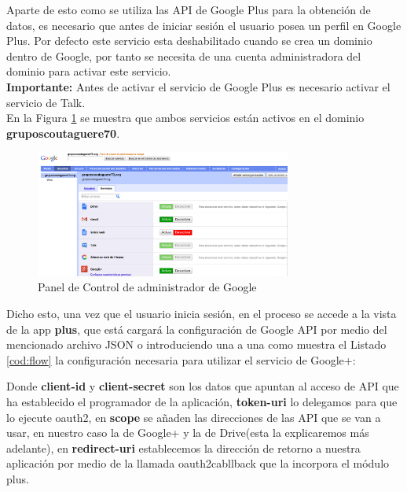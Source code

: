 Aparte de esto como se utiliza las API de Google Plus para la obtención de datos, es necesario que antes de iniciar sesión el usuario posea un perfil en Google Plus.
Por defecto este servicio esta deshabilitado cuando se crea un dominio dentro de Google, por tanto se necesita de una cuenta administradora del dominio para activar este servicio.\\

\textbf{Importante:} Antes de activar el servicio de Google Plus es necesario activar el servicio de Talk.\\

En la Figura \ref{fig:panel} se muestra  que ambos servicios están activos en el dominio \textbf{gruposcoutaguere70}.\\

\begin{figure}[H]
\begin{center}
\includegraphics[width=0.75\textwidth]{images/panel_google.jpg}
\caption{Panel de Control de administrador de Google}
\label{fig:panel}
\end{center}
\end{figure}


Dicho esto, una vez que el usuario inicia sesión, en el proceso se accede a la vista de la app \textbf{plus}, que está cargará la configuración de Google API por medio del mencionado archivo JSON o introduciendo una a una 
como muestra el Listado \ref{cod:flow} la configuración necesaria para utilizar el servicio de Google+:\\



\bigskip

Donde \textbf{client-id} y \textbf{client-secret} son los datos que apuntan al acceso de API que ha establecido el programador de la aplicación, \textbf{token-uri} lo delegamos para que lo ejecute oauth2, en \textbf{scope}
se añaden las direcciones de las API que se van a usar, en nuestro caso la de Google+ y la de Drive(esta la explicaremos más adelante), en \textbf{redirect-uri} establecemos la dirección de retorno a nuestra aplicación 
por medio de la llamada oauth2cabllback que la incorpora el módulo plus.\\

